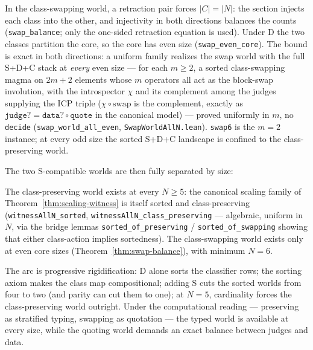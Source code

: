 \documentclass[sigconf,screen]{acmart}
\theoremstyle{remark}
\begin{document}
\begin{theorem}
\label{thm:swap-balance}
In the class-swapping world, a retraction pair forces $|C| = |N|$: the section injects each class into the other, and injectivity in both directions balances the counts (\texttt{swap\_balance}; only the one-sided retraction equation is used). Under D the two classes partition the core, so the core has even size (\texttt{swap\_even\_core}). The bound is exact in both directions: a uniform family realizes the swap world with the full S+D+C stack at \emph{every} even size --- for each $m \geq 2$, a sorted class-swapping magma on $2m+2$ elements whose $m$ operators all act as the block-swap involution, with the introspector $\chi$ and its complement among the judges supplying the ICP triple ($\chi \circ \mathrm{swap}$ is the complement, exactly as $\texttt{judge?} = \texttt{data?} \circ \texttt{quote}$ in the canonical model) --- proved uniformly in $m$, no \texttt{decide} (\texttt{swap\_world\_all\_even}, \texttt{SwapWorldAllN.lean}). \texttt{swap6} is the $m\!=\!2$ instance; at every odd size the sorted S+D+C landscape is confined to the class-preserving world.
\end{theorem}

The two S-compatible worlds are then fully separated by size:

\begin{proposition}
\label{prop:sorted-spectrum}
The class-preserving world exists at every $N \geq 5$: the canonical scaling family of Theorem~\ref{thm:scaling-witness} is itself sorted and class-preserving (\texttt{witnessAllN\_sorted}, \texttt{witnessAllN\_class\_preserving} --- algebraic, uniform in $N$, via the bridge lemmas \texttt{sorted\_of\_preserving} / \texttt{sorted\_of\_swapping} showing that either class-action implies sortedness). The class-swapping world exists only at even core sizes (Theorem~\ref{thm:swap-balance}), with minimum $N\!=\!6$.
\end{proposition}

The arc is progressive rigidification: D alone sorts the classifier rows; the sorting axiom makes the class map compositional; adding S cuts the sorted worlds from four to two (and parity can cut them to one); at $N\!=\!5$, cardinality forces the class-preserving world outright. Under the computational reading --- preserving as stratified typing, swapping as quotation --- the typed world is available at every size, while the quoting world demands an exact balance between judges and data.
\end{document}
